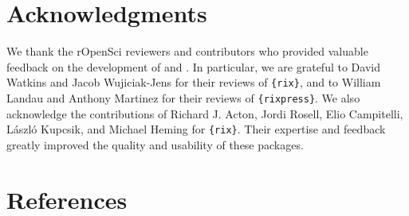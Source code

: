 \documentclass[
  article]{jss}
\begin{document}
\section*{Acknowledgments}\label{acknowledgments}

We thank the rOpenSci reviewers and contributors who provided valuable
feedback on the development of  and . In
particular, we are grateful to David Watkins and Jacob Wujiciak-Jens for
their reviews of \texttt{\{rix\}}, and to William Landau and Anthony
Martinez for their reviews of \texttt{\{rixpress\}}. We also acknowledge
the contributions of Richard J. Acton, Jordi Rosell, Elio Campitelli,
László Kupcsik, and Michael Heming for \texttt{\{rix\}}. Their expertise
and feedback greatly improved the quality and usability of these
packages.

\section*{References}\label{references}

\renewcommand{\bibsection}{}

\end{document}
